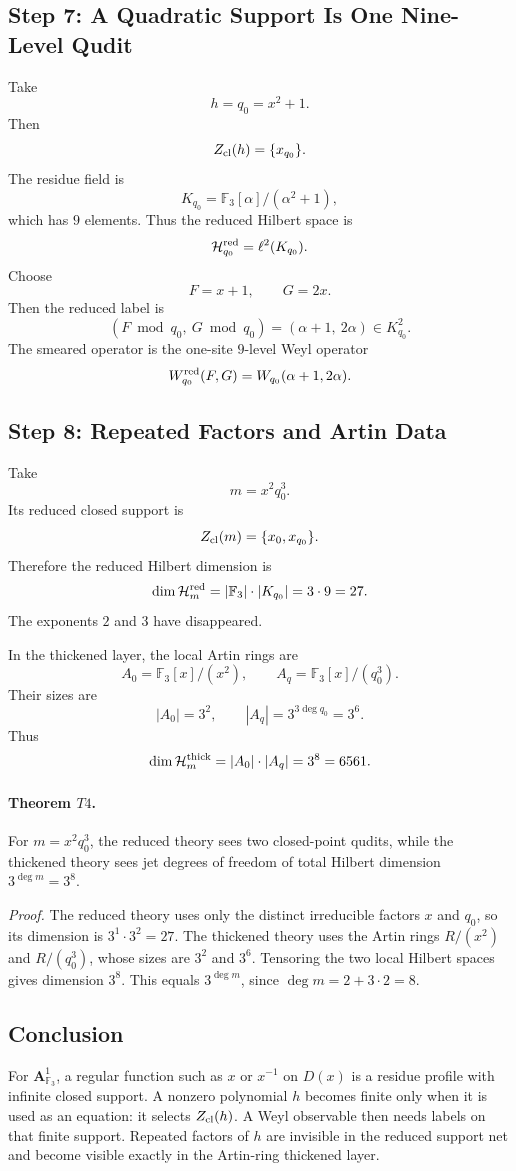 \subsection{Step 7: A Quadratic Support Is One Nine-Level Qudit}
Take
\[
  h=q_0=x^2+1.
\]
Then
\[
  Z_{\rm cl}(h)=\{x_{q_0}\}.
\]
The residue field is
\[
  K_{q_0}=\mathbb F_3[\alpha]/(\alpha^2+1),
\]
which has \(9\) elements.  Thus the reduced Hilbert space is
\[
  \mathcal H_{q_0}^{\rm red}=\ell^2(K_{q_0}).
\]
Choose
\[
  F=x+1,\qquad G=2x.
\]
Then the reduced label is
\[
  (F\bmod q_0,\ G\bmod q_0)=(\alpha+1,\ 2\alpha)\in K_{q_0}^2.
\]
The smeared operator is the one-site \(9\)-level Weyl operator
\[
  W_{q_0}^{\rm red}(F,G)=W_{q_0}(\alpha+1,2\alpha).
\]
\subsection{Step 8: Repeated Factors and Artin Data}
Take
\[
  m=x^2q_0^3.
\]
Its reduced closed support is
\[
  Z_{\rm cl}(m)=\{x_0,x_{q_0}\}.
\]
Therefore the reduced Hilbert dimension is
\[
  \dim\mathcal H_m^{\rm red}
  =
  |\mathbb F_3|\cdot|K_{q_0}|
  =
  3\cdot9=27.
\]
The exponents \(2\) and \(3\) have disappeared.

In the thickened layer, the local Artin rings are
\[
  A_0=\mathbb F_3[x]/(x^2),\qquad
  A_q=\mathbb F_3[x]/(q_0^3).
\]
Their sizes are
\[
  |A_0|=3^2,\qquad |A_q|=3^{3\deg q_0}=3^6.
\]
Thus
\[
  \dim\mathcal H_m^{\rm thick}
  =
  |A_0|\cdot|A_q|
  =
  3^8=6561.
\]
\paragraph{Theorem \(T4\).}
For \(m=x^2q_0^3\), the reduced theory sees two closed-point qudits, while the
thickened theory sees jet degrees of freedom of total Hilbert dimension
\(3^{\deg m}=3^8\).

\emph{Proof.}
The reduced theory uses only the distinct irreducible factors \(x\) and
\(q_0\), so its dimension is \(3^1\cdot3^2=27\).  The thickened theory uses the
Artin rings \(R/(x^2)\) and \(R/(q_0^3)\), whose sizes are \(3^2\) and
\(3^6\).  Tensoring the two local Hilbert spaces gives dimension \(3^8\).
This equals \(3^{\deg m}\), since \(\deg m=2+3\cdot2=8\).

\subsection{Conclusion}
For \(\mathbf A^1_{\mathbb F_3}\), a regular function such as \(x\) or
\(x^{-1}\) on \(D(x)\) is a residue profile with infinite closed support.  A
nonzero polynomial \(h\) becomes finite only when it is used as an equation:
it selects \(Z_{\rm cl}(h)\).  A Weyl observable then needs labels on that
finite support.  Repeated factors of \(h\) are invisible in the reduced
support net and become visible exactly in the Artin-ring thickened layer.
